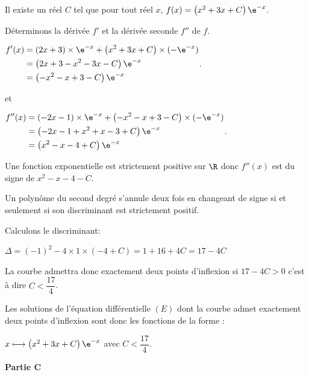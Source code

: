 \begin{enumerate}
Il existe un réel $C$ tel que pour tout réel $x$, $f(x)= \left(x^{2}+3 x+C\right) \e^{-x}$. 

Déterminons la dérivée $f'$ et la dérivée seconde $f''$ de $f$. 

$\begin{aligned}
f'(x) & = \left(2x+3\right) \times \e^{-x}+ \left(x^2+3x+C\right)\times (-\e^{-x})\\
	& = \left(2x+3-x^2-3x-C\right)\e^{-x}\\
	& =\left(-x^2-x+3-C\right)\e^{-x}
\end{aligned}$.

et

$\begin{aligned}
f''(x) & = \left(-2x-1\right) \times \e^{-x}+ \left(-x^2-x+3-C\right)\times (-\e^{-x})\\
	& = \left(-2x-1+x^2+x-3+C\right)\e^{-x}\\
	& =\left(x^2-x-4+C\right)\e^{-x}
	\end{aligned}$.

Une fonction exponentielle est strictement positive sur $\R$ donc $f''(x)$ est du signe de $x^2-x-4-C$.

Un polynôme du second degré s'annule deux fois en changeant de signe  si et seulement si son discriminant est strictement positif.

Calculons le discriminant:

$\Delta = (-1)^2 -4 \times 1 \times (-4+C) = 1+16+4C=17-4C$

La courbe admettra donc exactement deux points d'inflexion si $17- 4C > 0$ c'est à dire $C < \dfrac{17}{4}$.

Les solutions de l'équation différentielle $(E)$ dont la courbe admet exactement deux points d'inflexion sont donc les fonctions de la forme :

$x\longmapsto \left(x^{2}+3 x+C\right) \e^{-x} $  avec $C<\dfrac{17}{4}$.
\end{enumerate}

\medskip

\textbf{Partie C}

\medskip

%

